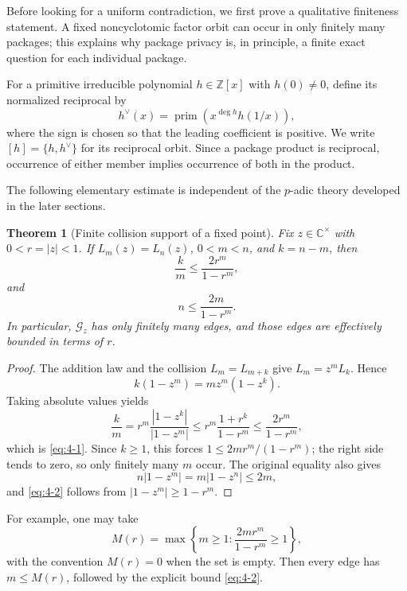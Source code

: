 \documentclass[11pt]{article}
\numberwithin{equation}{section}
\newtheorem{theorem}{Theorem}[section]
\theoremstyle{definition}
\newcommand{\Z}{\mathbb Z}
\newcommand{\C}{\mathbb C}
\begin{document}
Before looking for a uniform contradiction, we first prove a qualitative finiteness statement.  A fixed noncyclotomic factor orbit can occur in only finitely many packages; this explains why package privacy is, in principle, a finite exact question for each individual package.

For a primitive irreducible polynomial \(h\in\Z[x]\) with \(h(0)\neq0\),
define its normalized reciprocal by
\[
 h^\vee(x)=\operatorname{prim}\!\left(x^{\deg h}h(1/x)\right),
\]
where the sign is chosen so that the leading coefficient is positive.  We
write \([h]=\{h,h^\vee\}\) for its reciprocal orbit.  Since a package
product is reciprocal, occurrence of either member implies occurrence of both
in the product.

The following elementary estimate is independent of the \(p\)-adic theory
developed in the later sections.

\begin{theorem}[Finite collision support of a fixed point]
\label{thm:pointfinite}
Fix \(z\in\C^\times\) with \(0<r=|z|<1\).  If
\(L_m(z)=L_n(z)\), \(0<m<n\), and \(k=n-m\), then
\begin{equation}
 \frac{k}{m}
 \leq \frac{2r^m}{1-r^m},
 \label{eq:4-1}
\end{equation}
and
\begin{equation}
 n\leq\frac{2m}{1-r^m}.
 \label{eq:4-2}
\end{equation}
In particular, \(\mathcal G_z\) has only finitely many edges, and those edges
are effectively bounded in terms of \(r\).
\end{theorem}

\begin{proof}
The addition law and the collision \(L_m=L_{m+k}\) give
\(L_m=z^mL_k\).  Hence
\[
 k(1-z^m)=mz^m(1-z^k).
\]
Taking absolute values yields
\[
 \frac{k}{m}
 =r^m\frac{|1-z^k|}{|1-z^m|}
 \leq r^m\frac{1+r^k}{1-r^m}
 \leq\frac{2r^m}{1-r^m},
\]
which is \eqref{eq:4-1}.  Since \(k\geq1\), this forces
\(1\leq2mr^m/(1-r^m)\); the right side tends to zero, so only finitely
many \(m\) occur.  The original equality also gives
\[
 n|1-z^m|=m|1-z^n|\leq2m,
\]
and \eqref{eq:4-2} follows from \(|1-z^m|\geq1-r^m\).
\end{proof}

For example, one may take
\[
 M(r)=\max\left\{m\geq1:\frac{2mr^m}{1-r^m}\geq1\right\},
\]
with the convention \(M(r)=0\) when the set is empty.  Then every edge has
\(m\leq M(r)\), followed by the explicit bound \eqref{eq:4-2}.
\end{document}
